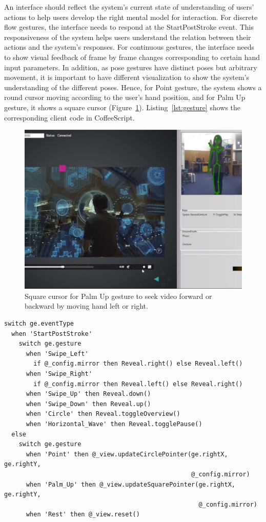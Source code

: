 An interface
should reflect the system's current state of understanding of users'
actions to help users develop the right mental model for interaction. For
discrete flow gestures, the interface needs to respond at the StartPostStroke
event. This responsiveness of the system helps users understand the relation
between their actions and the system's responses. For continuous gestures, the
interface needs to show visual feedback of frame by frame changes
corresponding to certain hand input parameters. In addition, as pose gestures
have distinct poses but arbitrary movement, it is important to have different 
visualization to show the system's understanding of the different
poses. Hence, for Point gesture, the system shows a round cursor moving
according to the user's hand position, and for Palm Up gesture, it shows a
square cursor (Figure~\ref{fig:palm-up}).
Listing~\ref{lst:gesture} shows the corresponding client code in CoffeeScript.

\begin{figure}[tbh]
\centering
\includegraphics[trim=0 2.7cm 0 0,
clip, width=\columnwidth]{figures/video_control.PNG}
\caption{Square cursor for Palm Up gesture to seek video forward or backward by
moving hand left or right.}
\label{fig:palm-up}
\end{figure}

\begin{lstlisting}[caption={Client code mapping gesture events to actions in
CoffeeScript.}, label={lst:client-code}] 
switch ge.eventType
  when 'StartPostStroke'
    switch ge.gesture
      when 'Swipe_Left'
        if @_config.mirror then Reveal.right() else Reveal.left()
      when 'Swipe_Right'
        if @_config.mirror then Reveal.left() else Reveal.right()
      when 'Swipe_Up' then Reveal.down()
      when 'Swipe_Down' then Reveal.up()
      when 'Circle' then Reveal.toggleOverview()
      when 'Horizontal_Wave' then Reveal.togglePause()
  else
    switch ge.gesture
      when 'Point' then @_view.updateCirclePointer(ge.rightX, ge.rightY,
                                                   @_config.mirror)
      when 'Palm_Up' then @_view.updateSquarePointer(ge.rightX, ge.rightY,
                                                     @_config.mirror)
      when 'Rest' then @_view.reset()
\end{lstlisting}

